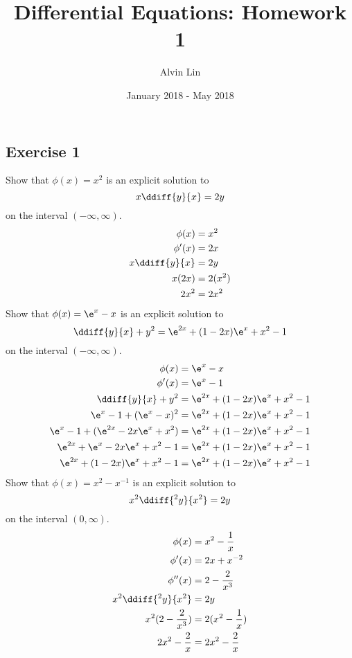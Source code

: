 \documentclass{math}
\title{Differential Equations: Homework 1}
\author{Alvin Lin}
\date{January 2018 - May 2018}
\begin{document}
\maketitle

\subsection*{Exercise 1}
Show that \( \phi(x) = x^2 \) is an explicit solution to
\[ x\ddiff{y}{x} = 2y \]
on the interval \( (-\infty,\infty) \).
\begin{align*}
  \phi(x) &= x^2 \\
  \phi'(x) &= 2x \\
  x\ddiff{y}{x} &= 2y \\
  x(2x) &= 2(x^2) \\
  2x^2 &= 2x^2
\end{align*}
Show that \( \phi(x) = \e^x-x \) is an explicit solution to
\[ \ddiff{y}{x}+y^2 = \e^{2x}+(1-2x)\e^x+x^2-1 \]
on the interval \( (-\infty,\infty) \).
\begin{align*}
  \phi(x) &= \e^x-x \\
  \phi'(x) &= \e^x-1 \\
  \ddiff{y}{x}+y^2 &= \e^{2x}+(1-2x)\e^x+x^2-1 \\
  \e^x-1+(\e^x-x)^2 &= \e^{2x}+(1-2x)\e^x+x^2-1 \\
  \e^x-1+(\e^{2x}-2x\e^x+x^2) &= \e^{2x}+(1-2x)\e^x+x^2-1 \\
  \e^{2x}+\e^x-2x\e^x+x^2-1 &= \e^{2x}+(1-2x)\e^x+x^2-1 \\
  \e^{2x}+(1-2x)\e^x+x^2-1 &= \e^{2x}+(1-2x)\e^x+x^2-1
\end{align*}
Show that \( \phi(x) = x^2-x^{-1} \) is an explicit solution to
\[ x^2\ddiff{^2y}{x^2} = 2y \]
on the interval \( (0,\infty) \).
\begin{align*}
  \phi(x) &= x^2-\frac{1}{x} \\
  \phi'(x) &= 2x+x^{-2} \\
  \phi''(x) &= 2-\frac{2}{x^3} \\
  x^2\ddiff{^2y}{x^2} &= 2y \\
  x^2(2-\frac{2}{x^3}) &= 2(x^2-\frac{1}{x}) \\
  2x^2-\frac{2}{x} &= 2x^2-\frac{2}{x}
\end{align*}
\end{document}

